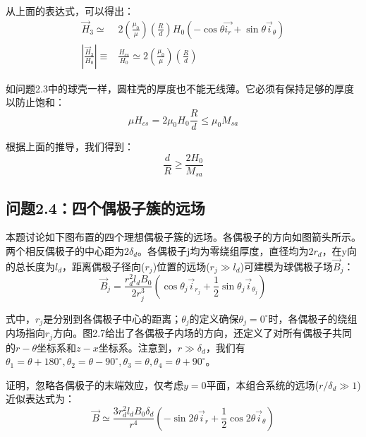从上面的表达式，可以得出：
\begin{align}
\vec{H}_3 \simeq& 2(\frac{\mu_0}{\mu}) (\frac{R}{d})H_0 (-\cos\theta \vec{i_r}+\sin\theta\vec{i}_\theta)\nonumber\\
\left|\frac{\vec{H}_3}{H_0}\right|\equiv&\frac{H_{cs}}{H_0}\simeq 2(\frac{\mu_0}{\mu}) (\frac{R}{d})
\end{align}

如问题2.3中的球壳一样，圆柱壳的厚度也不能无线薄。它必须有保持足够的厚度以防止饱和：
$$\mu H_{cs}=2\mu_0 H_0 \frac{R}{d}\le \mu_0 M_{sa}$$

根据上面的推导，我们得到：
\begin{equation}
\frac{d}{R}\ge \frac{2H_0}{M_{sa}}
\end{equation}


\subsection{问题2.4：四个偶极子簇的远场}
本题讨论如下图布置的四个理想偶极子簇的远场。各偶极子的方向如图箭头所示。两个相反偶极子的中心距为$2\delta_d$。各偶极子j均为零绕组厚度，直径均为$2r_d$，在y向的总长度为$l_d$，距离偶极子径向($r_j$)位置的远场($r_j \gg l_d$)可建模为球偶极子场$\vec{B}_j$：
\begin{equation}
\vec{B}_j=\frac{r_d^2 l_d B_0}{2r_j^3}(\cos\theta_j \vec{i}_{r_j}+\frac{1}{2} \sin\theta_j \vec{i}_{\theta_j})
\end{equation}

式中，$r_j$是分别到各偶极子中心的距离；$\theta_j$的定义确保$\theta_j=0^\circ$时，各偶极子的绕组内场指向$r_j$方向。图2.7给出了各偶极子内场的方向，还定义了对所有偶极子共同的$r-\theta$坐标系和$z-x$坐标系。注意到，$r\gg \delta_d$，我们有$\mathscr{\theta}_1=\theta+180^\circ,\theta_2=\theta-90^\circ,\theta_3=\theta,\theta_4=\theta + 90^\circ$。

证明，忽略各偶极子的末端效应，仅考虑$y=0$平面，本组合系统的远场($r/\delta_d \gg 1$)近似表达式为：
\begin{equation}
\vec{B}\simeq \frac{3r_d^2 l_d B_0 \delta_d}{r^4}(-\sin 2\theta \vec{i}_r+\frac{1}{2}\cos 2\theta \vec{i}_\theta)
\end{equation}

